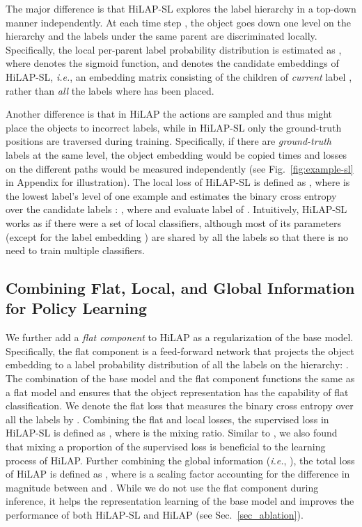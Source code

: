 \documentclass[11pt,a4paper]{article}
\newcommand{\ie}{\textit{i.e.}} \newcommand{\eg}{\textit{e.g.}}
\begin{document}
The major difference is that HiLAP-SL explores the label hierarchy  in a top-down manner independently.
At each time step , the object goes down one level on the hierarchy and the labels under the same parent are discriminated locally.
Specifically, the local per-parent label probability distribution  is estimated as ,
where  denotes the sigmoid function, and  denotes the candidate embeddings of HiLAP-SL, \ie, an embedding matrix consisting of the children of \textit{current} label , rather than \textit{all} the labels where  has been placed. 

Another difference is that in HiLAP the actions are sampled and thus might place the objects to incorrect labels, while in HiLAP-SL only the ground-truth positions are traversed during training.
Specifically, if there are  \textit{ground-truth} labels at the same level, the object embedding  would be copied  times and losses on the  different paths would be measured independently (see Fig.~\ref{fig:example-sl} in Appendix for illustration).
The local loss of HiLAP-SL is defined as ,
where  is the lowest label's level of one example and  estimates the binary cross entropy over the candidate labels :
,
where  and  evaluate label  of .
Intuitively, HiLAP-SL works as if there were a set of local classifiers, although most of its parameters (except for the label embedding ) are shared by all the labels so that there is no need to train multiple classifiers.



\subsection{Combining Flat, Local, and Global Information for Policy Learning}
\label{subsec_allThreeLoss}
We further add a \textit{flat component} to HiLAP as a regularization of the base model.
Specifically, the flat component is a feed-forward network that projects the object embedding  to a label probability distribution  of all the labels on the hierarchy: .
The combination of the base model and the flat component functions the same as a flat model and ensures that the object representation  has the capability of flat classification.
We denote the flat loss that measures the binary cross entropy over all the labels by
.
Combining the flat and local losses, the supervised loss in HiLAP-SL is defined as , where  is the mixing ratio.
Similar to \citet{celikyilmaz2018deep}, we also found that mixing a proportion of the supervised loss is beneficial to the learning process of HiLAP. Further combining the global information  (\ie, ), the total loss of HiLAP is defined as , where  is a scaling factor accounting for the difference in magnitude between  and .
While we do not use the flat component during inference, it helps the representation learning of the base model and improves the performance of both HiLAP-SL and HiLAP (see Sec.~\ref{sec_ablation}). 
\end{document}
